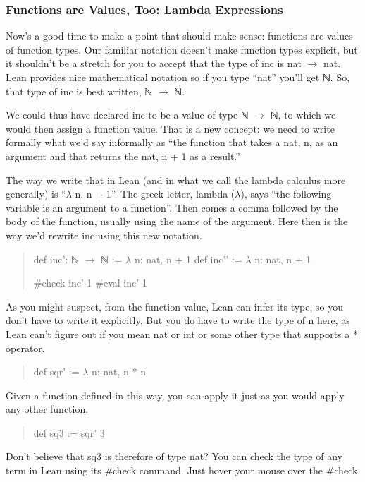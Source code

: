 \documentclass[letterpaper,10pt,english]{sphinxmanual}
\begin{document}
\subsubsection{Functions are Values, Too: Lambda Expressions}
\label{\detokenize{15-proofs:functions-are-values-too-lambda-expressions}}
Now’s a good time to make a point that should make sense: functions
are values of function types. Our familiar notation doesn’t make
function types explicit, but it shouldn’t be a stretch for you to
accept that the type of inc is nat \(\rightarrow\) nat.  Lean provides nice
mathematical notation so if you type “nat” you’ll get ℕ. So, that
type of inc is best written, ℕ \(\rightarrow\) ℕ.

We could thus have declared inc to be a value of type ℕ \(\rightarrow\) ℕ, to which
we would then assign a function value. That is a new concept: we need
to write formally what we’d say informally as “the function that takes
a nat, n, as an argument and that returns the nat, n + 1 as a result.”

The way we write that in Lean (and in what we call the lambda calculus
more generally) is “\(\lambda\) n, n + 1”. The greek letter, lambda (\(\lambda\)), says
“the following variable is an argument to a function”.  Then comes a
comma followed by the body of the function, usually using the name of
the argument. Here then is the way we’d rewrite inc using this new
notation.
\begin{quote}

def inc’: ℕ \(\rightarrow\) ℕ := \(\lambda\) n: nat, n + 1
def inc’’ := \(\lambda\) n: nat, n + 1

\#check inc’ 1
\#eval inc’ 1
\end{quote}

As you might suspect, from the function value, Lean can infer its
type, so you don’t have to write it explicitly. But you do have to
write the type of n here, as Lean can’t figure out if you mean nat or
int or some other type that supports a * operator.
\begin{quote}

def sqr’ := \(\lambda\) n: nat, n * n
\end{quote}

Given a function defined in this way, you can apply it just as you
would apply any other function.
\begin{quote}

def sq3 := sqr’ 3
\end{quote}

Don’t believe that sq3 is therefore of type nat? You can check the
type of any term in Lean using its \#check command.  Just hover your
mouse over the \#check.
\end{document}
